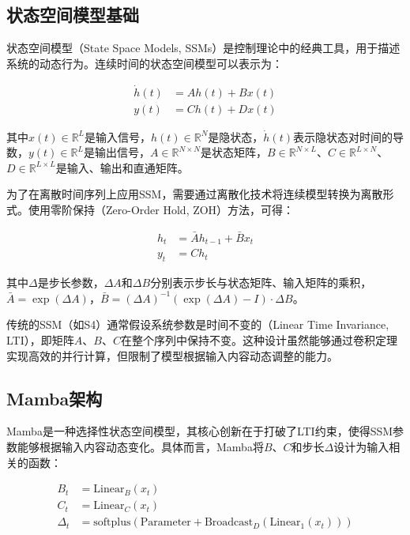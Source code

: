 \documentclass[12pt,a4paper,openany,oneside]{ctexbook}
\theoremstyle{definition}
\theoremstyle{remark}
\begin{document}
\subsection{状态空间模型基础}

状态空间模型（State Space Models, SSMs）是控制理论中的经典工具，用于描述系统的动态行为。连续时间的状态空间模型可以表示为：

\begin{equation}
\begin{aligned}
\dot{h}(t) &= Ah(t) + Bx(t) \\
y(t) &= Ch(t) + Dx(t)
\end{aligned}
\end{equation}

其中$x(t) \in \mathbb{R}^L$是输入信号，$h(t) \in \mathbb{R}^N$是隐状态，$\dot{h}(t)$表示隐状态对时间的导数，$y(t) \in \mathbb{R}^L$是输出信号，$A \in \mathbb{R}^{N \times N}$是状态矩阵，$B \in \mathbb{R}^{N \times L}$、$C \in \mathbb{R}^{L \times N}$、$D \in \mathbb{R}^{L \times L}$是输入、输出和直通矩阵。

为了在离散时间序列上应用SSM，需要通过离散化技术将连续模型转换为离散形式。使用零阶保持（Zero-Order Hold, ZOH）方法，可得：

\begin{equation}
\begin{aligned}
h_t &= \bar{A}h_{t-1} + \bar{B}x_t \\
y_t &= Ch_t
\end{aligned}
\end{equation}

其中$\Delta$是步长参数，$\Delta A$和$\Delta B$分别表示步长与状态矩阵、输入矩阵的乘积，$\bar{A} = \exp(\Delta A)$，$\bar{B} = (\Delta A)^{-1}(\exp(\Delta A) - I) \cdot \Delta B$。

传统的SSM（如S4\cite{gu2022efficiently}）通常假设系统参数是时间不变的（Linear Time Invariance, LTI），即矩阵$A$、$B$、$C$在整个序列中保持不变。这种设计虽然能够通过卷积定理实现高效的并行计算，但限制了模型根据输入内容动态调整的能力。

\subsection{Mamba架构}

Mamba\cite{gu2024mamba}是一种选择性状态空间模型，其核心创新在于打破了LTI约束，使得SSM参数能够根据输入内容动态变化。具体而言，Mamba将$B$、$C$和步长$\Delta$设计为输入相关的函数：

\begin{equation}
\begin{aligned}
B_t &= \text{Linear}_B(x_t) \\
C_t &= \text{Linear}_C(x_t) \\
\Delta_t &= \text{softplus}(\text{Parameter} + \text{Broadcast}_D(\text{Linear}_1(x_t)))
\end{aligned}
\end{equation}
\end{document}
